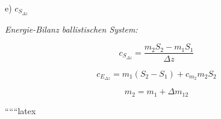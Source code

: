 e) \(c_{S_{\Delta z}}\)

\textit{Energie-Bilanz ballistischen System:}

\[
c_{S_{\Delta z}} = \frac{m_2 S_2 - m_1 S_1}{\Delta z}
\]

\[
c_{E_{\Delta z}} = m_1 (S_2 - S_1) + c_{m_2} m_2 S_2
\]

\[
m_2 = m_1 + \Delta m_{12}
\]

``````latex